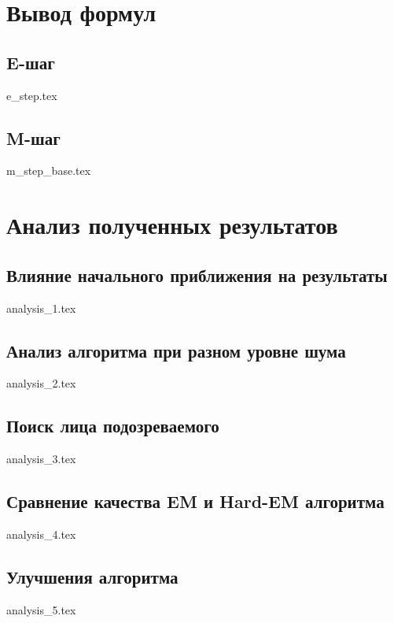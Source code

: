 \documentclass[unicode]{article}
\begin{document}
	\section{Вывод формул}
	
		\subsection{E-шаг}
		{e_step.tex}
		
		\subsection{M-шаг}
		{m_step_base.tex}
		
	\section{Анализ полученных результатов}
		
		\subsection{Влияние начального приближения на результаты}
		{analysis_1.tex}
		
		\subsection{Анализ алгоритма при разном уровне шума}
		{analysis_2.tex}
		
		\subsection{Поиск лица подозреваемого}
		{analysis_3.tex}
		
		\subsection{Сравнение качества EM и Hard-EM алгоритма}
		{analysis_4.tex}
		
		\subsection{Улучшения алгоритма}
		{analysis_5.tex}
\end{document}
